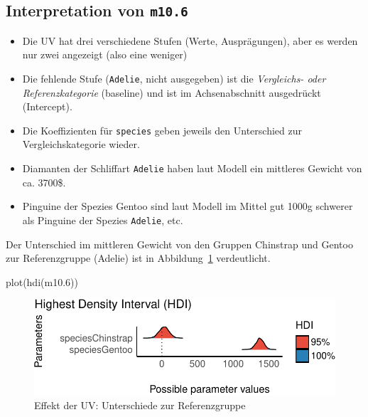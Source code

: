 \documentclass[
  a4paper,
  DIV=11]{scrreprt}
\newenvironment{Shaded}{\begin{snugshade}}{\end{snugshade}}
\newcommand{\FloatTok}[1]{\textcolor[rgb]{0.68,0.00,0.00}{#1}}
\newcommand{\FunctionTok}[1]{\textcolor[rgb]{0.28,0.35,0.67}{#1}}
\newcommand{\NormalTok}[1]{\textcolor[rgb]{0.00,0.23,0.31}{#1}}
\providecommand{\tightlist}{%
  \setlength{\itemsep}{0pt}\setlength{\parskip}{0pt}}\usepackage{longtable,booktabs,array}
\theoremstyle{definition}
\theoremstyle{remark}
\begin{document}
\hypertarget{interpretation-von-m10.6}{%
\subsection{\texorpdfstring{Interpretation von
\texttt{m10.6}}{Interpretation von m10.6}}\label{interpretation-von-m10.6}}

\begin{itemize}
\tightlist
\item
  Die UV hat drei verschiedene Stufen (Werte, Ausprägungen), aber es
  werden nur zwei angezeigt (also eine weniger)
\item
  Die fehlende Stufe (\texttt{Adelie}, nicht ausgegeben) ist die
  \emph{Vergleichs- oder Referenzkategorie} (baseline) und ist im
  Achsenabschnitt ausgedrückt (Intercept).
\item
  Die Koeffizienten für \texttt{species} geben jeweils den Unterschied
  zur Vergleichskategorie wieder.
\item
  Diamanten der Schliffart \texttt{Adelie} haben laut Modell ein
  mittleres Gewicht von ca. 3700\$.
\item
  Pinguine der Spezies Gentoo sind laut Modell im Mittel gut 1000g
  schwerer als Pinguine der Spezies \texttt{Adelie}, etc.
\end{itemize}

Der Unterschied im mittleren Gewicht von den Gruppen Chinstrap und
Gentoo zur Referenzgruppe (Adelie) ist in
Abbildung~\ref{fig-m106-params} verdeutlicht.

\begin{Shaded}
\begin{Highlighting}[]
\FunctionTok{plot}\NormalTok{(}\FunctionTok{hdi}\NormalTok{(m10}\FloatTok{.6}\NormalTok{))}
\end{Highlighting}
\end{Shaded}

\begin{figure}[H]

{\centering \includegraphics{./metrische-AV_files/figure-pdf/fig-m106-params-1.pdf}

}

\caption{\label{fig-m106-params}Effekt der UV: Unterschiede zur
Referenzgruppe}

\end{figure}
\end{document}
